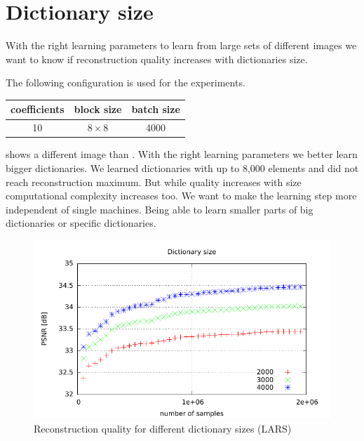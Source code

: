\clearpage

\section{Dictionary size}
With the right learning parameters to learn from large sets of
different images we want to know if reconstruction quality increases with
dictionaries size.

The following configuration is used for the experiments. 
\begin{table}[H]
\centering
\begin{tabular}{| c | c | c |}
\hline
\hline
coefficients & block size & batch size \\
\hline
10 & $8\times 8$ & 4000  \\
\hline
\end{tabular}
\end{table}

 shows a different image than
. With the right learning parameters 
we better learn bigger dictionaries. We learned dictionaries with up to 8,000
elements and did not reach reconstruction maximum. But while quality increases
with size computational complexity increases too. We want to make the learning
step more independent of single machines. Being able to learn smaller parts of
big dictionaries or specific dictionaries.


\begin{figure}[h]
\centering
\includegraphics[width = 1.0\textwidth]{../tests/results/dictSizeLassoGod.pdf}
\caption{Reconstruction quality for different dictionary sizes (LARS)}
\label{fig:dictSizeGood}
\end{figure}

